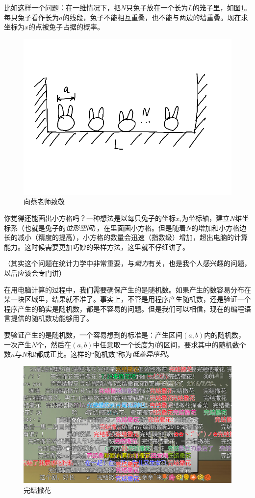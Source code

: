 比如这样一个问题：在一维情况下，把$N$只兔子放在一个长为$L$的笼子里，如图\ref{fig-rabbit-box}。每只兔子看作长为$a$的线段，兔子不能相互重叠，也不能与两边的墙重叠。现在求坐标为$x$的点被兔子占据的概率。
\begin{figure}[htb]
\centering
\includegraphics[width=0.33\linewidth]{fig/rabbit-box.png}
\caption{向蔡老师致敬}
\label{fig-rabbit-box}
\end{figure}

你觉得还能画出小方格吗？一种想法是以每只兔子的坐标$x_i$为坐标轴，建立$N$维坐标系（也就是兔子的\emph{位形空间}），在里面画小方格。但是随着$N$的增加和小方格边长的减小（精度的提高），小方格的数量会迅速（指数级）增加，超出电脑的计算能力。这时候需要更加巧妙的采样方法，这里就不仔细讲了。

（其实这个问题在统计力学中非常重要，与\emph{熵力}有关，也是我个人感兴趣的问题，以后应该会专门讲）

在用电脑计算的过程中，我们需要确保产生的是随机数。如果产生的数容易分布在某一块区域里，结果就不准了。事实上，不管是用程序产生随机数，还是验证一个程序产生的确实是随机数，都是不容易的问题。但是我们可以相信，现在的编程语言提供的随机数功能够用了。

要验证产生的是随机数，一个容易想到的标准是：产生区间$(a,b)$内的随机数，一次产生$N$个，然后在$(a,b)$中任意取一个长度为$l$的区间，要求其中的随机数个数$n$与$N$和$l$都成正比。这样的“随机数”称为\emph{低差异序列}。
\vfill
\begin{figure}[htb]
\centering
\includegraphics[width=\linewidth]{fig/final-flower.png}
\caption{完结撒花}
\label{fig-final-flower}
\end{figure}
\vfill
